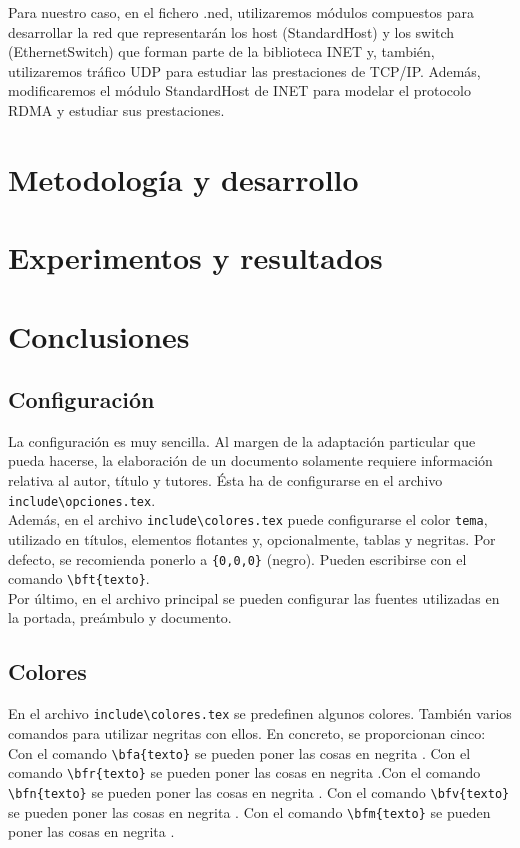 Para nuestro caso, en el fichero .ned, utilizaremos módulos compuestos para desarrollar la red que representarán los host (StandardHost) y los switch (EthernetSwitch) que forman parte de la biblioteca INET y, también, utilizaremos tráfico UDP para estudiar las prestaciones de TCP/IP. Además, modificaremos el módulo StandardHost de INET para modelar el protocolo RDMA y estudiar sus prestaciones.

\chapter{Metodología y desarrollo}

\chapter{Experimentos y resultados}

\chapter{Conclusiones}

\section{Configuración}
La configuración es muy sencilla. Al margen de la adaptación particular que pueda hacerse, la elaboración de un documento solamente requiere información relativa al autor, título y tutores. Ésta ha de configurarse en el archivo \verb+include\opciones.tex+.  \\

Además, en el archivo \verb+include\colores.tex+ puede configurarse el color \verb+tema+, utilizado en títulos, elementos flotantes y, opcionalmente, tablas y negritas. Por defecto, se recomienda ponerlo a \verb+{0,0,0}+  (negro). Pueden escribirse  con el comando \verb+\bft{texto}+. \\

Por último, en el archivo principal se pueden configurar las fuentes utilizadas en la portada, preámbulo y documento.

\section{Colores}


En el archivo \verb+include\colores.tex+ se predefinen algunos colores. También varios comandos para utilizar negritas con ellos. En concreto, se proporcionan cinco: Con el comando \verb+\bfa{texto}+ se pueden poner las cosas en negrita . Con el comando \verb+\bfr{texto}+ se pueden poner las cosas en negrita .Con el comando \verb+\bfn{texto}+ se pueden poner las cosas en negrita . Con el comando \verb+\bfv{texto}+ se pueden poner las cosas en negrita . Con el comando \verb+\bfm{texto}+ se pueden poner las cosas en negrita .\\

